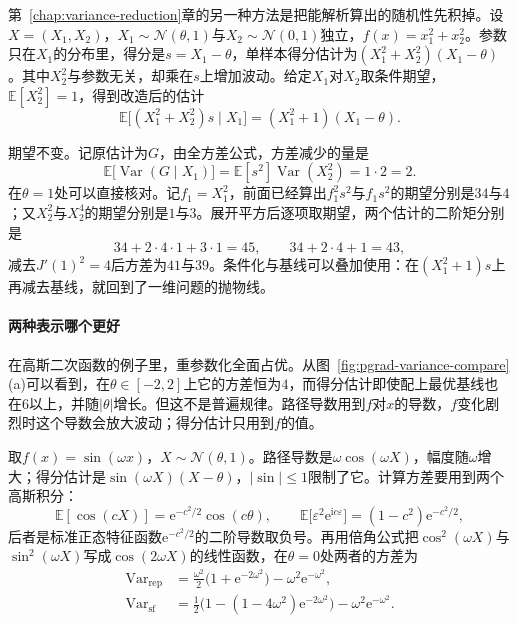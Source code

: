 第~\ref{chap:variance-reduction}章的另一种方法是把能解析算出的随机性先积掉。设$X=(X_{1},X_{2})$，$X_{1}\sim\mathcal{N}(\theta,1)$与$X_{2}\sim\mathcal{N}(0,1)$独立，$f(x)=x_{1}^{2}+x_{2}^{2}$。参数只在$X_{1}$的分布里，得分是$s=X_{1}-\theta$，单样本得分估计为$(X_{1}^{2}+X_{2}^{2})(X_{1}-\theta)$。其中$X_{2}^{2}$与参数无关，却乘在$s$上增加波动。给定$X_{1}$对$X_{2}$取条件期望，$\mathbb{E}[X_{2}^{2}]=1$，得到改造后的估计
\[
  \mathbb{E}\bigl[(X_{1}^{2}+X_{2}^{2})s\mid X_{1}\bigr]=(X_{1}^{2}+1)(X_{1}-\theta).
\]

期望不变。记原估计为$G$，由全方差公式，方差减少的量是
\[
  \mathbb{E}\bigl[\operatorname{Var}(G\mid X_{1})\bigr]=\mathbb{E}[s^{2}]\operatorname{Var}(X_{2}^{2})=1\cdot2=2 .
\]
在$\theta=1$处可以直接核对。记$f_{1}=X_{1}^{2}$，前面已经算出$f_{1}^{2}s^{2}$与$f_{1}s^{2}$的期望分别是$34$与$4$；又$X_{2}^{2}$与$X_{2}^{4}$的期望分别是$1$与$3$。展开平方后逐项取期望，两个估计的二阶矩分别是
\[
  34+2\cdot4\cdot1+3\cdot1=45,\qquad34+2\cdot4+1=43,
\]
减去$J'(1)^{2}=4$后方差为$41$与$39$。条件化与基线可以叠加使用：在$(X_{1}^{2}+1)s$上再减去基线，就回到了一维问题的抛物线。

\paragraph{两种表示哪个更好}

在高斯二次函数的例子里，重参数化全面占优。从图~\ref{fig:pgrad-variance-compare}(a)可以看到，在$\theta\in[-2,2]$上它的方差恒为$4$，而得分估计即使配上最优基线也在$6$以上，并随$\lvert\theta\rvert$增长。但这不是普遍规律。路径导数用到$f$对$x$的导数，$f$变化剧烈时这个导数会放大波动；得分估计只用到$f$的值。

取$f(x)=\sin(\omega x)$，$X\sim\mathcal{N}(\theta,1)$。路径导数是$\omega\cos(\omega X)$，幅度随$\omega$增大；得分估计是$\sin(\omega X)(X-\theta)$，$\lvert\sin\rvert\leq1$限制了它。计算方差要用到两个高斯积分：
\[
  \mathbb{E}[\cos(cX)]=\mathrm{e}^{-c^{2}/2}\cos(c\theta),\qquad\mathbb{E}\bigl[\varepsilon^{2}\mathrm{e}^{\mathrm{i}c\varepsilon}\bigr]=(1-c^{2})\mathrm{e}^{-c^{2}/2},
\]
后者是标准正态特征函数$\mathrm{e}^{-c^{2}/2}$的二阶导数取负号。再用倍角公式把$\cos^{2}(\omega X)$与$\sin^{2}(\omega X)$写成$\cos(2\omega X)$的线性函数，在$\theta=0$处两者的方差为
\begin{align}
  \operatorname{Var}_{\mathrm{rep}}&=\frac{\omega^{2}}{2}\bigl(1+\mathrm{e}^{-2\omega^{2}}\bigr)-\omega^{2}\mathrm{e}^{-\omega^{2}},\label{eq:pgrad-sin-rep}\\
  \operatorname{Var}_{\mathrm{sf}}&=\frac{1}{2}\bigl(1-(1-4\omega^{2})\mathrm{e}^{-2\omega^{2}}\bigr)-\omega^{2}\mathrm{e}^{-\omega^{2}}.\label{eq:pgrad-sin-sf}
\end{align}

